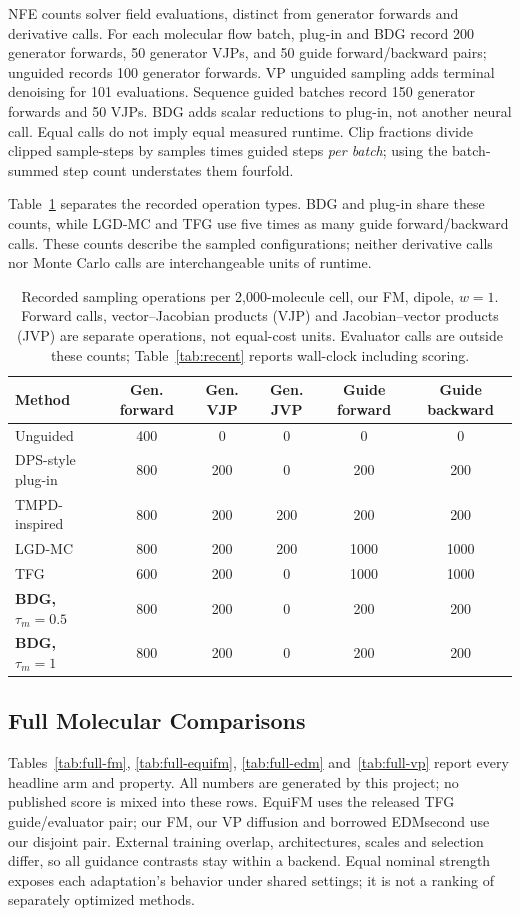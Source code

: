 \documentclass{article}
\begin{document}
NFE counts solver field evaluations, distinct from generator forwards and derivative calls. For each molecular flow batch, plug-in and BDG record 200 generator forwards, 50 generator VJPs, and 50 guide forward/backward pairs; unguided records 100 generator forwards. VP unguided sampling adds terminal denoising for 101 evaluations. Sequence guided batches record 150 generator forwards and 50 VJPs. BDG adds scalar reductions to plug-in, not another neural call. Equal calls do not imply equal measured runtime. Clip fractions divide clipped sample-steps by samples times guided steps \emph{per batch}; using the batch-summed step count understates them fourfold.

Table~\ref{tab:cost} separates the recorded operation types. BDG and plug-in share these counts, while LGD-MC and TFG use five times as many guide forward/backward calls. These counts describe the sampled configurations; neither derivative calls nor Monte Carlo calls are interchangeable units of runtime.
\begin{table}[!htbp]
\centering\small
\caption{Recorded sampling operations per 2,000-molecule cell, our FM, dipole, $w=1$. Forward calls, vector--Jacobian products (VJP) and Jacobian--vector products (JVP) are separate operations, not equal-cost units. Evaluator calls are outside these counts; Table~\ref{tab:recent} reports wall-clock including scoring.}
\label{tab:cost}
\begin{tabular}{lccccc}
\toprule
Method & Gen. forward & Gen. VJP & Gen. JVP & Guide forward & Guide backward\\
\midrule
Unguided & 400 & 0 & 0 & 0 & 0\\
DPS-style plug-in & 800 & 200 & 0 & 200 & 200\\
TMPD-inspired & 800 & 200 & 200 & 200 & 200\\
LGD-MC & 800 & 200 & 200 & 1000 & 1000\\
TFG & 600 & 200 & 0 & 1000 & 1000\\
\textbf{BDG, $\tau_m=0.5$} & 800 & 200 & 0 & 200 & 200\\
\textbf{BDG, $\tau_m=1$} & 800 & 200 & 0 & 200 & 200\\
\bottomrule
\end{tabular}
\end{table}

\subsection{Full Molecular Comparisons}\label{app:comparisons}
Tables~\ref{tab:full-fm}, \ref{tab:full-equifm}, \ref{tab:full-edm} and~\ref{tab:full-vp} report every headline arm and property. All numbers are generated by this project; no published score is mixed into these rows. EquiFM uses the released TFG guide/evaluator pair; our FM, our VP diffusion and borrowed EDMsecond use our disjoint pair. External training overlap, architectures, scales and selection differ, so all guidance contrasts stay within a backend. Equal nominal strength exposes each adaptation's behavior under shared settings; it is not a ranking of separately optimized methods.
\end{document}
